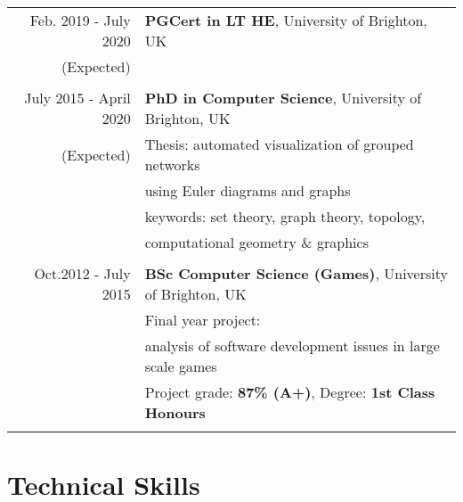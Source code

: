 \documentclass[a4paper,11pt]{article} %
\begin{document}
\begin{tabular}{r|p{11cm}}

Feb. 2019 - July 2020 & \textbf{PGCert in LT HE}, University of Brighton, UK\\
(Expected)&\\
\multicolumn{2}{c}{} \\


July 2015 - April 2020 & \textbf{PhD in Computer Science}, University of Brighton, UK\\
(Expected)& Thesis: automated visualization of grouped networks\\
& using Euler diagrams and graphs\\
& keywords: set theory, graph theory, topology,\\
& computational geometry \& graphics \\
\multicolumn{2}{c}{} \\

	
Oct.2012 - July 2015 & \textbf{BSc Computer Science (Games)}, University of Brighton, UK\\
& Final year project: \\
& analysis of software development issues in large scale games\\
&\normalsize Project grade: \textbf{87\% (A+)}, Degree: \textbf{1st Class Honours} \\
\multicolumn{2}{c}{} \\

\end{tabular}








\section{Technical Skills}
\end{document}

